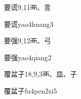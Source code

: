 \begin{entry}{要谎}{9,11}{⾑、⾔}
  \begin{phonetics}{要谎}{yao4huang3}
  \end{phonetics}
\end{entry}

\begin{entry}{要强}{9,12}{⾑、⼸}
  \begin{phonetics}{要强}{yao4qiang2}
  \end{phonetics}
\end{entry}

\begin{entry}{覆盆子}{18,9,3}{⾑、⽫、⼦}
  \begin{phonetics}{覆盆子}{fu4pen2zi5}
  \end{phonetics}
\end{entry}



